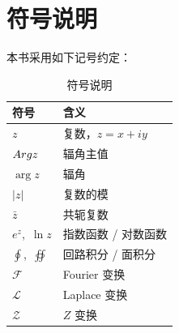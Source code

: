 \section{符号说明}
\label{sec:符号说明}

本书采用如下记号约定：

\begin{table}[H]
\centering
\caption{符号说明}
\label{tab:符号说明}
\begin{tabular}{ll}
\toprule
符号 & 含义 \\
\midrule
$z$ & 复数，$z = x + iy$ \\
$Arg z$ & 辐角主值 \\
$\arg z$ & 辐角 \\
$|z|$ & 复数的模 \\
$\bar{z}$ & 共轭复数 \\
$e^z$,\, $\ln z$ & 指数函数 / 对数函数 \\
$\oint$,\, $\oiint$ & 回路积分 / 面积分 \\
$\mathcal{F}$ & Fourier 变换 \\
$\mathcal{L}$ & Laplace 变换 \\
$\mathcal{Z}$ & $Z$ 变换 \\
\bottomrule
\end{tabular}
\end{table}
